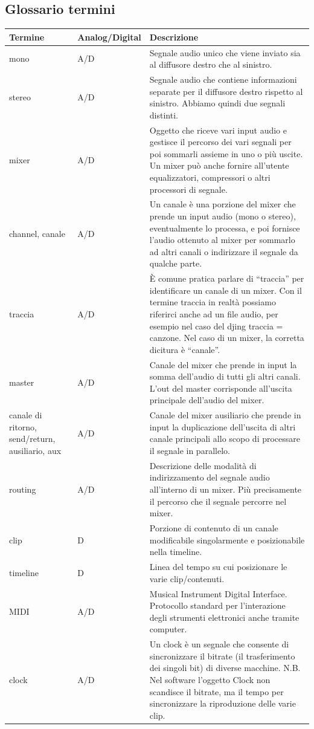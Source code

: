 \documentclass[a4paper,12pt]{report}
\begin{document}
\subsection{Glossario termini}
\begin{center}
\begin{longtable}{| m{5em} | m{3.2cm}| m{7cm} |} 
 \hline
 \textbf{Termine} & \textbf{Analog/Digital} & \textbf{Descrizione} \\ [0.5ex] 
 \hline
 mono & A/D & Segnale audio unico che viene inviato sia al diffusore destro che al sinistro. \\ 
 \hline
 stereo & A/D & Segnale audio che contiene informazioni separate per il diffusore destro rispetto al sinistro.
Abbiamo quindi due segnali distinti. \\
 \hline
 mixer & A/D & Oggetto che riceve vari input audio e gestisce il percorso dei vari segnali  per poi sommarli assieme in uno o più uscite.
Un mixer può anche fornire all’utente equalizzatori, compressori o altri processori di segnale. \\
 \hline
 channel, canale & A/D & Un canale è una porzione del mixer che prende un input audio (mono o stereo), eventualmente lo processa, e poi fornisce l’audio ottenuto al mixer per sommarlo ad altri canali o indirizzare il segnale da qualche parte. \\
 \hline
 traccia & A/D & È comune pratica parlare di “traccia” per identificare un canale di un mixer. Con il termine traccia in realtà possiamo riferirci anche ad un file audio, per esempio nel caso del djing traccia = canzone. Nel caso di un mixer, la corretta dicitura è “canale”. \\ 
 \hline
 master & A/D & Canale del mixer che prende in input la somma dell’audio di tutti gli altri canali. L’out del master corrisponde all’uscita principale dell’audio del mixer. \\
 \hline 
 canale di ritorno, send/return, ausiliario, aux & A/D & Canale del mixer ausiliario che prende in input la duplicazione dell’uscita di altri canale principali allo scopo di processare il segnale in parallelo. \\
 \hline
 routing & A/D & Descrizione delle modalità di indirizzamento del segnale audio all’interno di un mixer. Più precisamente il percorso che il segnale percorre nel mixer. \\
 \hline
 clip & D & Porzione di contenuto di un canale modificabile singolarmente e posizionabile nella timeline. \\
 \hline
 timeline & D & Linea del tempo su cui posizionare le varie clip/contenuti. \\
 \hline
 MIDI & A/D & Musical Instrument Digital Interface.
Protocollo standard per l’interazione degli strumenti elettronici anche tramite computer. \\
\hline
clock & A/D & Un clock è un segnale che consente di sincronizzare il bitrate (il trasferimento dei singoli bit) di diverse macchine.
N.B.
Nel software l’oggetto Clock non scandisce il bitrate, ma il tempo per sincronizzare la riproduzione delle varie clip. \\
\hline
\end{longtable}
\end{center}
\end{document}
